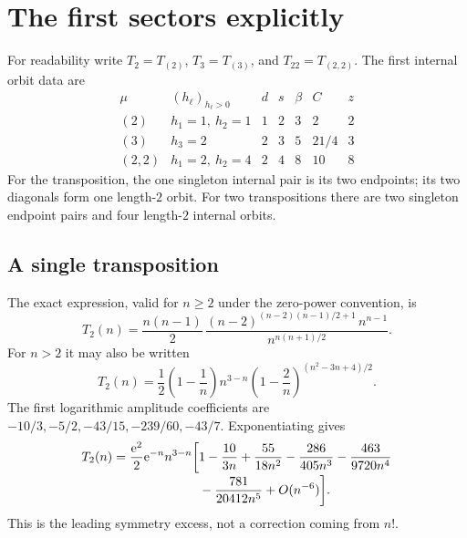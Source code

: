 \documentclass[11pt,letterpaper]{article}
\numberwithin{equation}{section}
\theoremstyle{definition}\newtheorem{definition}[theorem]{Definition}
\theoremstyle{remark}\newtheorem{remark}[theorem]{Remark}
\begin{document}
\section{The first sectors explicitly}\label{cmg:sec:first}
For readability write $T_2=T_{(2)}$, $T_3=T_{(3)}$, and $T_{22}=T_{(2,2)}$. The first internal orbit data are
\[
\begin{array}{c|c|r|r|r|r|r}
 \mu&(h_\ell)_{h_\ell>0}&d&s&\beta&C&z\\\hline
 (2)&h_1=1,\ h_2=1&1&2&3&2&2\\
 (3)&h_3=2&2&3&5&21/4&3\\
 (2,2)&h_1=2,\ h_2=4&2&4&8&10&8
\end{array}
\]
For the transposition, the one singleton internal pair is its two endpoints; its two diagonals form one length-$2$ orbit. For two transpositions there are two singleton endpoint pairs and four length-$2$ internal orbits.

\subsection{A single transposition}
The exact expression, valid for $n\ge2$ under the zero-power convention, is
\begin{equation}\label{cmg:eq:T2exact}
 T_2(n)=\frac{n(n-1)}2\,
 \frac{(n-2)^{(n-2)(n-1)/2+1}\,n^{n-1}}{n^{n(n+1)/2}}.
\end{equation}
For $n>2$ it may also be written
\[
 T_2(n)=\frac12\left(1-\frac1n\right)n^{3-n}
        \left(1-\frac2n\right)^{(n^2-3n+4)/2}.
\]
The first logarithmic amplitude coefficients are $-10/3,-5/2,-43/15,-239/60,-43/7$. Exponentiating gives
\begin{align}\label{cmg:eq:T2exp}
 T_2(n)=\frac{\mathrm e^2}2\mathrm e^{-n}n^{3-n}\biggl[&1-\frac{10}{3n}
 +\frac{55}{18n^2}-\frac{286}{405n^3}
 -\frac{463}{9720n^4}\notag\\[-2pt]
 &-\frac{781}{20412n^5}+O(n^{-6})\biggr].
\end{align}
This is the leading symmetry excess, not a correction coming from $n!$.
\end{document}
